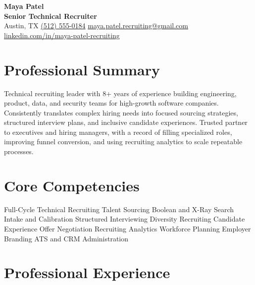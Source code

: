 \documentclass[10pt,letterpaper]{article}
\newcommand{\contactsep}{\enspace\textcolor{rulecolor}{\textbar}\enspace}
\begin{document}
\begin{center}
  {\fontsize{24}{27}\selectfont\bfseries\color{heading} Maya Patel}\\[0.12em]
  {\large\bfseries Senior Technical Recruiter}\\[0.30em]
  Austin, TX
  \contactsep \href{tel:+15125550184}{(512) 555-0184}
  \contactsep \href{mailto:maya.patel.recruiting@gmail.com}{maya.patel.recruiting@gmail.com}\\[0.12em]
  \href{https://www.linkedin.com/in/maya-patel-recruiting}{linkedin.com/in/maya-patel-recruiting}
\end{center}
\vspace{-0.45em}

\section*{Professional Summary}
Technical recruiting leader with 8+ years of experience building engineering, product, data, and security teams for high-growth software companies. Consistently translates complex hiring needs into focused sourcing strategies, structured interview plans, and inclusive candidate experiences. Trusted partner to executives and hiring managers, with a record of filling specialized roles, improving funnel conversion, and using recruiting analytics to scale repeatable processes.

\section*{Core Competencies}
Full-Cycle Technical Recruiting \textbullet{} Talent Sourcing \textbullet{} Boolean and X-Ray Search \textbullet{} Intake and Calibration \textbullet{} Structured Interviewing \textbullet{} Diversity Recruiting \textbullet{} Candidate Experience \textbullet{} Offer Negotiation \textbullet{} Recruiting Analytics \textbullet{} Workforce Planning \textbullet{} Employer Branding \textbullet{} ATS and CRM Administration

\section*{Professional Experience}
\end{document}
